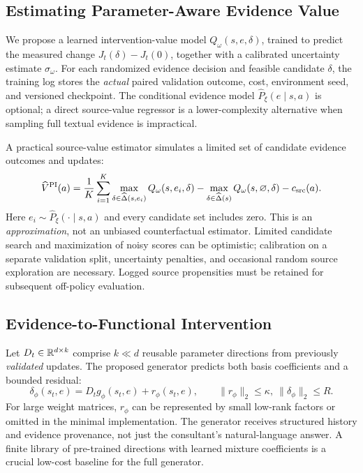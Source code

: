 \subsection{Estimating Parameter-Aware Evidence Value}
\label{sec:valuelearning}
We propose a learned intervention-value model
$Q_\omega(s,e,\delta)$, trained to predict the measured change
$J_t(\delta)-J_t(0)$, together with a calibrated uncertainty estimate
$\sigma_\omega$. For each randomized evidence decision and feasible
candidate $\delta$, the training log stores the \emph{actual} paired
validation outcome, cost, environment seed, and versioned checkpoint.
The conditional evidence model
$\widehat P_\xi(e\mid s,a)$ is optional; a direct
source-value regressor is a lower-complexity alternative when sampling
full textual evidence is impractical.

A practical source-value estimator simulates a limited set of
candidate evidence outcomes and updates:
\begin{equation}
\widehat V^{\rm PI}(a)
= \frac{1}{K}\sum_{i=1}^K
 \max_{\delta\in\widehat\Delta(s,e_i)}
 Q_\omega(s,e_i,\delta)
 -\max_{\delta\in\widehat\Delta(s)}
 Q_\omega(s,\varnothing,\delta)-c_{\rm src}(a).
\label{eq:est}
\end{equation}
Here $e_i\sim\widehat P_\xi(\cdot\mid s,a)$ and every candidate set
includes zero. This is an \emph{approximation}, not an unbiased
counterfactual estimator. Limited candidate search and maximization
of noisy scores can be optimistic; calibration on a separate
validation split, uncertainty penalties, and occasional random
source exploration are necessary. Logged source propensities must
be retained for subsequent off-policy evaluation.

\subsection{Evidence-to-Functional Intervention}
\label{sec:generator}
Let $D_t\in\mathbb{R}^{d\times k}$ comprise $k\ll d$ reusable parameter
directions from previously \emph{validated} updates. The proposed
generator predicts both basis coefficients and a bounded residual:
\begin{equation}
\delta_\phi(s_t,e)=
    D_t g_\phi(s_t,e)+r_\phi(s_t,e),\qquad
    \|r_\phi\|_2\le \kappa,\ \|\delta_\phi\|_2\le R.
\label{eq:functional}
\end{equation}
For large weight matrices, $r_\phi$ can be represented by small
low-rank factors or omitted in the minimal implementation.
The generator receives structured history and evidence provenance,
not just the consultant's natural-language answer. A finite library
of pre-trained directions with learned mixture coefficients is a
crucial low-cost baseline for the full generator.

